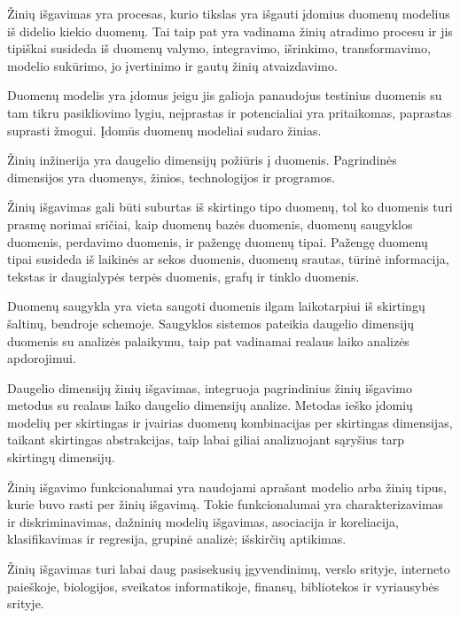 Žinių išgavimas yra procesas, kurio tikslas yra išgauti įdomius duomenų modelius iš didelio kiekio duomenų.
Tai taip pat yra vadinama žinių atradimo procesu ir jis tipiškai susideda iš duomenų valymo, integravimo, išrinkimo, transformavimo, modelio sukūrimo, jo įvertinimo ir gautų žinių atvaizdavimo.

Duomenų modelis yra įdomus jeigu jis galioja panaudojus testinius duomenis su tam tikru pasikliovimo lygiu, neįprastas ir potencialiai yra pritaikomas, paprastas suprasti žmogui.
Įdomūs duomenų modeliai sudaro žinias. 

Žinių inžinerija yra daugelio dimensijų požiūris į duomenis. Pagrindinės dimensijos yra duomenys, žinios, technologijos ir programos.

Žinių išgavimas gali būti suburtas iš skirtingo tipo duomenų, tol ko duomenis turi prasmę norimai sričiai, kaip duomenų bazės duomenis, duomenų saugyklos duomenis, perdavimo duomenis, ir pažengę duomenų tipai. 
Pažengę duomenų tipai susideda iš laikinės ar sekos duomenis, duomenų srautas, tūrinė informacija, tekstas ir daugialypės terpės duomenis, grafų ir tinklo duomenis.

Duomenų saugykla yra vieta saugoti duomenis ilgam laikotarpiui iš skirtingų šaltinų, bendroje schemoje.
Saugyklos sistemos pateikia daugelio dimensijų duomenis su analizės palaikymu, taip pat vadinamai realaus laiko analizės apdorojimui.

Daugelio dimensijų žinių išgavimas, integruoja pagrindinius žinių išgavimo metodus su realaus laiko daugelio dimensijų analize.
Metodas ieško įdomių modelių per skirtingas ir įvairias duomenų kombinacijas per skirtingas dimensijas, taikant skirtingas abstrakcijas, taip labai giliai analizuojant sąryšius tarp skirtingų dimensijų.

Žinių išgavimo funkcionalumai yra naudojami aprašant modelio arba žinių tipus, kurie buvo rasti per žinių išgavimą.
Tokie funkcionalumai yra charakterizavimas ir diskriminavimas, dažninių modelių išgavimas, asociacija ir koreliacija, klasifikavimas ir regresija, grupinė analizė; išskirčių aptikimas.

Žinių išgavimas turi labai daug pasisekusių įgyvendinimų, verslo srityje, interneto paieškoje, biologijos, sveikatos informatikoje, finansų, bibliotekos ir vyriausybės srityje.